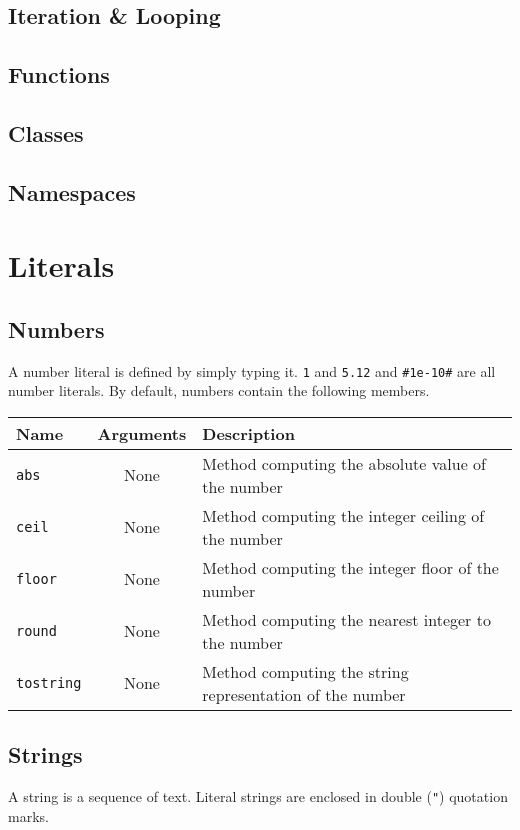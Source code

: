 \documentclass[11pt]{article}
\newcommand{\literal}[1]{\lstinline[style=DSL,identifierstyle=\itshape]!#1!}
\newcommand{\variable}[1]{\literal{#1}}
\begin{document}
\subsection{Iteration \& Looping}

\subsection{Functions}

\subsection{Classes}

\subsection{Namespaces}

\newpage
\section {Literals}
\subsection{Numbers}
A number literal is defined by simply typing it.  \literal{1} and \literal{5.12} and \literal{#1e-10#} are all number literals.  
By default, numbers contain the following members.

\begin{center}
\begin{tabular}{|l|c|p{3.5in}|}
\hline
Name & Arguments & Description\\
\hline
\variable{abs} & None & Method computing the absolute value of the number\\
\hline
\variable{ceil} & None & Method computing the integer ceiling of the number\\
\hline
\variable{floor} & None & Method computing the integer floor of the number\\
\hline
\variable{round} & None & Method computing the nearest integer to the number\\
\hline
\variable{tostring} & None & Method computing the string representation of the number\\
\hline
\end{tabular}
\end{center}

\subsection{Strings}
A string is a sequence of text. Literal strings are enclosed in double (\literal{"}) quotation marks.
\end{document}
